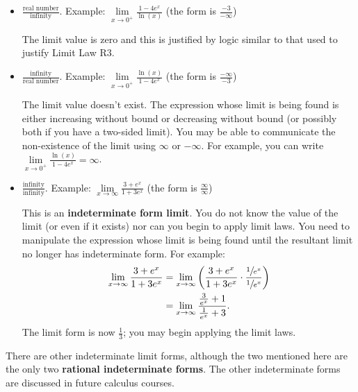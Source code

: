 \documentclass[12pt,]{book}
\newcommand{\terminology}[1]{\textbf{#1}}
\theoremstyle{plain}
\theoremstyle{definition}
\theoremstyle{definition}
\theoremstyle{definition}
\theoremstyle{definition}
\theoremstyle{definition}
\numberwithin{equation}{section}
\newcommand{\fe}[2]{#1\mathopen{}\left(#2\right)\mathclose{}}
\begin{document}
\leavevmode%
\begin{itemize}[label=\textbullet]
\item{}\(\frac{\text{real number}}{\text{infinity}}\). Example: \(\lim\limits_{x\to0^{+}}\frac{1-4e^{x}}{\fe{\ln}{x}}\) (the form is \(\frac{-3}{-\infty}\))%
\par
The limit value is zero and this is justified by logic similar to that used to justify Limit Law R3.%
\end{itemize}
\leavevmode%
\begin{itemize}[label=\textbullet]
\item{}\(\frac{\text{infinity}}{\text{real number}}\). Example: \(\lim\limits_{x\to0^{+}}\frac{\fe{\ln}{x}}{1-4e^{x}}\) (the form is \(\frac{-\infty}{-3}\))%
\par
The limit value doesn't exist.  The expression whose limit is being found is either increasing without bound or decreasing without bound (or possibly both if you have a two-sided limit).   You may be able to communicate the non-existence of the limit using \(\infty\) or \(-\infty\). For example, you can write \(\lim\limits_{x\to0^{+}}\frac{\fe{\ln}{x}}{1-4e^{x}}=\infty\).%
\end{itemize}
\leavevmode%
\begin{itemize}[label=\textbullet]
\item{}\(\frac{\text{infinity}}{\text{infinity}}\). Example: \(\lim\limits_{x\to\infty}\frac{3+e^x}{1+3e^x}\) (the form is \(\frac{\infty}{\infty}\))%
\par
This is an \terminology{indeterminate form limit}. You do not know the value of the limit (or even if it exists) nor can you begin to apply limit laws.  You need to manipulate the expression whose limit is being found until the resultant limit no longer has indeterminate form.  For example:\begin{align*}
\lim_{x\to\infty}\frac{3+e^x}{1+3e^x}&=\lim_{x\to\infty}\left(\frac{3+e^x}{1+3e^x}\cdot\frac{\sfrac{1}{e^x}}{\sfrac{1}{e^x}}\right)\\
&=\lim_{x\to\infty}\frac{\frac{3}{e^x}+1}{\frac{1}{e^x}+3}\text{.}
\end{align*}The limit form is now \(\frac{1}{3}\); you may begin applying the limit laws.%
\end{itemize}
There are other indeterminate limit forms, although the two mentioned here are the only two \terminology{rational indeterminate forms}.  The other indeterminate forms are discussed in future calculus courses.%
\typeout{************************************************}
\typeout{************************************************}
\end{document}
